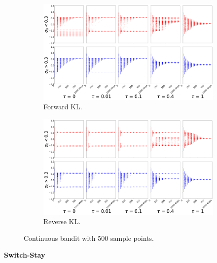 \documentclass{article}
\begin{document}
\begin{figure}[!htb]
  \centering
  \begin{subfigure}[b]{0.5\linewidth}
    \centering
    \includegraphics[width=0.8\columnwidth]{figs/bandit/monte-carlo/500/mean_forward_optim=adam_modes=1_lr=0.005.png}
    \caption{Forward KL.}
    \label{fig:500-sample-cont-bandit-forward}
  \end{subfigure}%
  \begin{subfigure}[b]{0.5\linewidth}
        \centering
        \includegraphics[width=0.8\columnwidth]{figs/bandit/monte-carlo/500/mean_reverse_optim=adam_modes=1_lr=0.005.png}
        \caption{Reverse KL.}
        \label{fig:500-sample-cont-bandit-reverse}
  \end{subfigure}
  \caption{Continuous bandit with 500 sample points.}
\end{figure}


\textbf{Switch-Stay}
\end{document}
